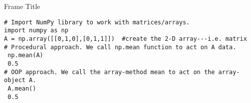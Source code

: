 \documentclass[10pt,aspectratio=169,xcolor=x11names,compress,dvipsnames]{beamer}
\begin{document}
\begin{frame}{Frame Title}
    
\begin{example}
\begin{verbatim}
# Import NumPy library to work with matrices/arrays.
import numpy as np 
A = np.array([[0,1,0],[0,1,1]])  #create the 2-D array---i.e. matrix
# Procedural approach. We call np.mean function to act on A data.
 np.mean(A)  
 0.5
# OOP approach. We call the array-method mean to act on the array-object A.
 A.mean()  
 0.5
\end{verbatim}


\end{example}

\end{frame}
\end{document}
